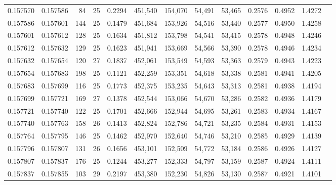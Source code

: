 \begin{tabular}{rrrrrrrrrrrrr}
0.157570 & 0.157586 &  84 &  25 &                                     0.2294 & 451,540 & 154,070 &  54,491 &  53,465 & 0.2576 & 0.4952 & 1.4272 \\
0.157586 & 0.157601 & 144 &  25 &                                     0.1479 & 451,684 & 153,926 &  54,516 &  53,440 & 0.2577 & 0.4950 & 1.4258 \\
0.157601 & 0.157612 & 128 &  25 &                                     0.1634 & 451,812 & 153,798 &  54,541 &  53,415 & 0.2578 & 0.4948 & 1.4246 \\
0.157612 & 0.157632 & 129 &  25 &                                     0.1623 & 451,941 & 153,669 &  54,566 &  53,390 & 0.2578 & 0.4946 & 1.4234 \\
0.157632 & 0.157654 & 120 &  27 &                                     0.1837 & 452,061 & 153,549 &  54,593 &  53,363 & 0.2579 & 0.4943 & 1.4223 \\
0.157654 & 0.157683 & 198 &  25 &                                     0.1121 & 452,259 & 153,351 &  54,618 &  53,338 & 0.2581 & 0.4941 & 1.4205 \\
0.157683 & 0.157699 & 116 &  25 &                                     0.1773 & 452,375 & 153,235 &  54,643 &  53,313 & 0.2581 & 0.4938 & 1.4194 \\
0.157699 & 0.157721 & 169 &  27 &                                     0.1378 & 452,544 & 153,066 &  54,670 &  53,286 & 0.2582 & 0.4936 & 1.4179 \\
0.157721 & 0.157740 & 122 &  25 &                                     0.1701 & 452,666 & 152,944 &  54,695 &  53,261 & 0.2583 & 0.4934 & 1.4167 \\
0.157740 & 0.157763 & 158 &  26 &                                     0.1413 & 452,824 & 152,786 &  54,721 &  53,235 & 0.2584 & 0.4931 & 1.4153 \\
0.157764 & 0.157795 & 146 &  25 &                                     0.1462 & 452,970 & 152,640 &  54,746 &  53,210 & 0.2585 & 0.4929 & 1.4139 \\
0.157796 & 0.157807 & 131 &  26 &                                     0.1656 & 453,101 & 152,509 &  54,772 &  53,184 & 0.2586 & 0.4926 & 1.4127 \\
0.157807 & 0.157837 & 176 &  25 &                                     0.1244 & 453,277 & 152,333 &  54,797 &  53,159 & 0.2587 & 0.4924 & 1.4111 \\
0.157837 & 0.157855 & 103 &  29 &                                     0.2197 & 453,380 & 152,230 &  54,826 &  53,130 & 0.2587 & 0.4921 & 1.4101 \\

\end{tabular}
